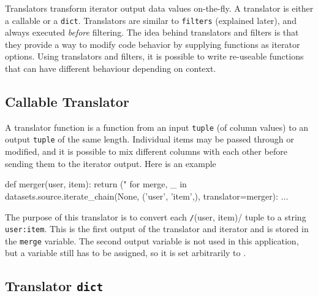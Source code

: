 Translators transform iterator output data values on-the-fly.  A
translator is either a callable or a \texttt{dict}.  Translators are
similar to \texttt{filters} (explained later), and always
executed \emph{before} filtering.  The idea behind translators and
filters is that they provide a way to modify code behavior by
supplying functions as iterator options.  Using translators and
filters, it is possible to write re-useable functions that can have
different behaviour depending on context.


\subsection*{Callable Translator}

A translator function is a function from an input \texttt{tuple} (of
column values) to an output \texttt{tuple} of the same length.
Individual items may be passed through or modified, and it is possible
to mix different columns with each other before sending them to the
iterator output.  Here is an example
\begin{python}
def merger(user, item):
    return ("%
for merge, _ in datasets.source.iterate_chain(None, ('user', 'item',),
                                     translator=merger):
    ...
\end{python}
The purpose of this translator is to convert each
\texttt/(user, item)/ tuple to a string \texttt{user:item}.  This is
the first output of the translator and iterator and is stored in the
\texttt{merge} variable.  The second output variable is not used in
this application, but a variable still has to be assigned, so it is
set arbitrarily to \pyNone.



\subsection*{Translator \texttt{dict}}

